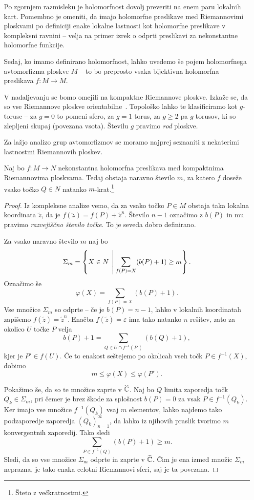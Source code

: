Po zgornjem razmisleku je holomorfnost dovolj preveriti na enem
paru lokalnih kart. Pomembno je omeniti, da imajo holomorfne
preslikave med Riemannovimi ploskvami po definiciji enake lokalne
lastnosti kot holomorfne preslikave v kompleksni ravnini -- velja
na primer izrek o odprti preslikavi za nekonstantne holomorfne
funkcije.

Sedaj, ko imamo definirano holomorfnost, lahko uvedemo še pojem
holomorfnega avtomorfizma ploskve $M$ -- to bo preprosto vsaka
bijektivna holomorfna preslikava $f \colon M \to M$.

V nadaljevanju se bomo omejili na kompaktne Riemannove ploskve.
Izkaže se, da so vse Riemannove ploskve
orientabilne~\cite[razdelek 1.2.6]{Forstneric}. Topološko lahko te
klasificiramo kot $g$-toruse -- za $g=0$ to pomeni sfero, za $g=1$
torus, za $g \geq 2$ pa $g$ torusov, ki so zlepljeni skupaj
(povezana vsota). Številu $g$ pravimo \emph{rod} ploskve.



Za lažjo analizo grup avtomorfizmov se moramo najprej seznaniti z
nekaterimi lastnostmi Riemannovih ploskev.

\begin{trditev}
\label{td:deg}
Naj bo $f \colon M \to N$ nekonstantna holomorfna preslikava med
kompaktnima Riemannovima ploskvama. Tedaj obstaja naravno število
$m$, za katero $f$ doseže vsako točko $Q \in N$ natanko
$m$-krat.\footnote{Šteto z večkratnostmi.}
\end{trditev}

\begin{proof}
Iz kompleksne analize vemo, da za vsako točko $P \in M$ obstaja
taka lokalna koordinata $\tilde{z}$, da je
$f(\tilde{z}) = f(P) + \tilde{z}^n$. Število $n-1$ označimo z
$b(P)$ in mu pravimo \emph{razvejiščno število točke}. To je seveda
dobro definirano.

Za vsako naravno število $m$ naj bo
\[
\Sigma_m =
\left\{X \in N~\middle\vert~\sum_{f(P)=X} (b(P)+1) \geq m\right\}.
\]
Označimo še
\[
\varphi(X) = \sum_{f(P) = X} (b(P)+1).
\]
Vse množice $\Sigma_m$ so odprte -- če je $b(P) = n-1$, lahko v
lokalnih koordinatah zapišemo $f(\tilde{z}) = \tilde{z}^n$. Enačba
$f(\tilde{z}) = \varepsilon$ ima tako natanko $n$ rešitev, zato za
okolico $U$ točke $P$ velja
\[
b(P) + 1 = \sum_{Q \in U \cap f^{-1}(P')} (b(Q) + 1),
\]
kjer je $P' \in f(U)$. Če to enakost seštejemo po okolicah vseh
točk $P \in f^{-1}(X)$, dobimo
\[
m \leq \varphi(X) \leq \varphi(P').
\]

Pokažimo še, da so te množice zaprte v $\widehat{\mathbb{C}}$. Naj bo $Q$ limita
zaporedja točk $Q_k \in \Sigma_m$, pri čemer je brez škode za
splošnost $b(P) = 0$ za vsak $P \in f^{-1}(Q_k)$. Ker imajo vse
množice $f^{-1}(Q_k)$ vsaj $m$ elementov, lahko najdemo tako
podzaporedje zaporedja $(Q_k)_{n=1}^\infty$, da lahko iz njihovih
praslik tvorimo $m$ konvergentnih zaporedij. Tako sledi
\[
\sum_{P \in f^{-1}(Q)} (b(P)+1) \geq m.
\]
Sledi, da so vse množice $\Sigma_m$ odprte in zaprte v $\widehat{\mathbb{C}}$. Čim
je ena izmed množic $\Sigma_m$ neprazna, je tako enaka celotni
Riemannovi sferi, saj je ta povezana.
\end{proof}

